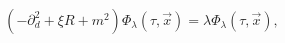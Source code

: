 \begin{equation}
\left(-\partial _{d}^{2}+\xi R+m^{2}\right)\Phi _{\lambda }\left(\tau ,\vec{x}\right)=\lambda \Phi _{\lambda }\left(\tau ,\vec{x}\right),
\label{main eigenvalue eq}\end{equation}

